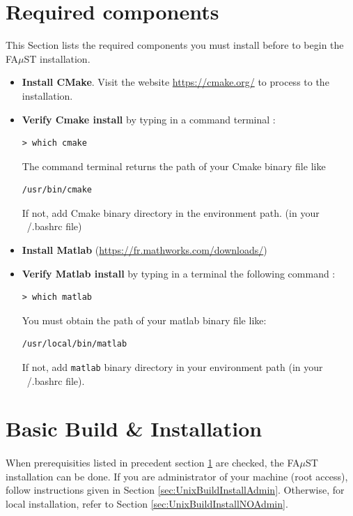 \section{Required components}\label{sec:RequiredTools}
This Section lists the required components you must install before to begin the FA$\mu$ST installation. 
\begin{itemize}
\item \textbf{Install CMake}. Visit the website \url{https://cmake.org/} to process to the installation.
\item \textbf{Verify Cmake install} by typing in a command terminal : 
\begin{lstlisting}
> which cmake
\end{lstlisting}
The command terminal returns the path of your Cmake binary file like
\begin{lstlisting}[backgroundcolor=\color{white}]
/usr/bin/cmake
\end{lstlisting}
If not, add Cmake binary directory in the environment path. (in your ~/.bashrc file)

\item \textbf{Install Matlab} (\url{https://fr.mathworks.com/downloads/})

\item \textbf{Verify Matlab install} by typing in a terminal the following command : 
\begin{lstlisting}
> which matlab
\end{lstlisting}
You must obtain the path of your matlab binary file like: 
\begin{lstlisting}[backgroundcolor=\color{white}]
/usr/local/bin/matlab
\end{lstlisting}
If not, add \texttt{matlab} binary directory in your environment path (in your ~/.bashrc file). 

\end{itemize}



\section{Basic Build \& Installation}\label{sec:UnixBuildInstall}
\paragraph{}When prerequisities listed in precedent section \ref{sec:RequiredTools} are checked, the FA$\mu$ST installation can be done. If you are administrator of your machine (root access), follow instructions given in Section \ref{sec:UnixBuildInstallAdmin}. Otherwise, for local installation, refer to Section \ref{sec:UnixBuildInstallNOAdmin}. 

